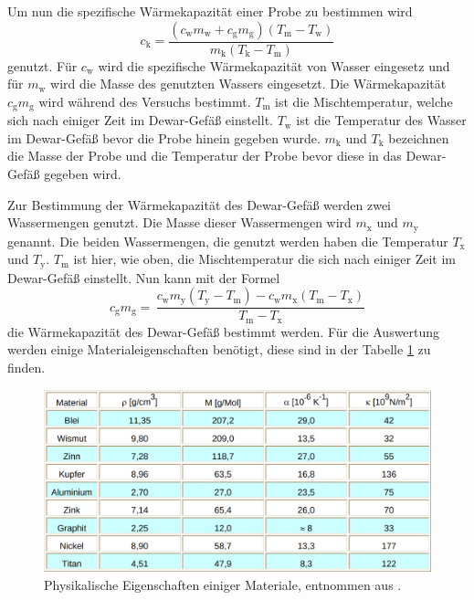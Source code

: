 Um nun die spezifische Wärmekapazität einer Probe zu bestimmen wird
\begin{equation}
   c_\text{k} = \frac{(c_\text{w}m_\text{w} + c_\text{g}m_\text{g})(T_\text{m}-T_\text{w})}{m_\text{k}(T_\text{k}-T_\text{m})} 
   \label{eqn:kapa}
\end{equation}
genutzt.
Für $c_\text{w}$ wird die spezifische Wärmekapazität von Wasser eingesetz und für $m_\text{w}$ wird die Masse des genutzten Wassers eingesetzt.
Die Wärmekapazität $c_\text{g}m_\text{g}$ wird während des Versuchs bestimmt.
$T_\text{m}$ ist die Mischtemperatur, welche sich nach einiger Zeit im Dewar-Gefäß einstellt.
$T_\text{w}$ ist die Temperatur des Wasser im Dewar-Gefäß bevor die Probe hinein gegeben wurde.
$m_\text{k}$ und $T_\text{k}$ bezeichnen die Masse der Probe und die Temperatur der Probe bevor diese in das Dewar-Gefäß gegeben wird.

Zur Bestimmung der Wärmekapazität des Dewar-Gefäß werden zwei Wassermengen genutzt.
Die Masse dieser Wassermengen wird $m_\text{x}$ und $m_\text{y}$ genannt.
Die beiden Wassermengen, die genutzt werden haben die Temperatur $T_\text{x}$ und $T_\text{y}$.
$T_\text{m}$ ist hier, wie oben, die Mischtemperatur die sich nach einiger Zeit im Dewar-Gefäß einstellt.
Nun kann mit der Formel
\begin{equation}
    c_\text{g} m_\text{g} = \, \frac{c_\text{w}m_\text{y}(T_\text{y}-T_\text{m})-c_\text{w}m_\text{x}(T_\text{m}-T_\text{x})}{T_\text{m}-T_\text{x}}
    \label{eqn:dewar}
\end{equation}
die Wärmekapazität des Dewar-Gefäß bestimmt werden.
Für die Auswertung werden einige Materialeigenschaften benötigt, diese sind in der Tabelle \ref{fig:material} zu finden.
\begin{figure}
    \centering
    \includegraphics[width=\textwidth]{content/data/tabelleV201.png}
    \caption{Physikalische Eigenschaften einiger Materiale, entnommen aus \cite{anleitung}.}
    \label{fig:material}
\end{figure}